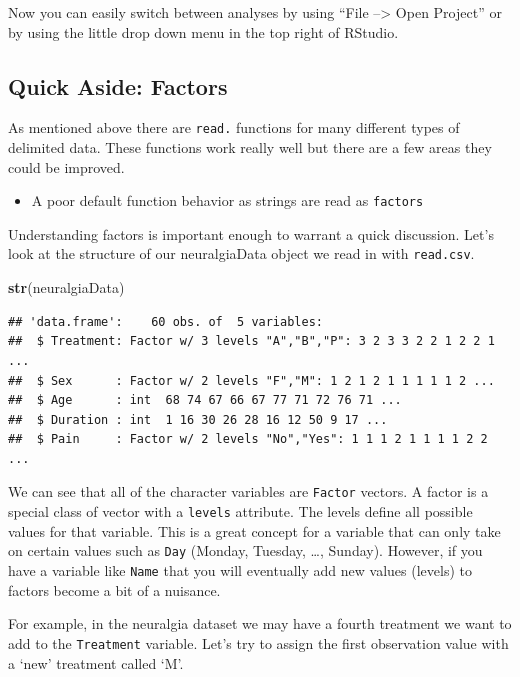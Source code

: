 \documentclass[
]{book}
\newenvironment{Shaded}{\begin{snugshade}}{\end{snugshade}}
\newcommand{\KeywordTok}[1]{\textcolor[rgb]{0.13,0.29,0.53}{\textbf{#1}}}
\newcommand{\NormalTok}[1]{#1}
\providecommand{\tightlist}{%
  \setlength{\itemsep}{0pt}\setlength{\parskip}{0pt}}
\theoremstyle{definition}
\theoremstyle{definition}
\theoremstyle{definition}
\theoremstyle{remark}
\begin{document}
Now you can easily switch between analyses by using ``File --\textgreater{} Open Project'' or by using the little drop down menu in the top right of RStudio.

\hypertarget{quick-aside-factors-1}{%
\subsection{Quick Aside: Factors}\label{quick-aside-factors-1}}

As mentioned above there are \texttt{read.} functions for many different types of delimited data. These functions work really well but there are a few areas they could be improved.

\begin{itemize}
\tightlist
\item
  A poor default function behavior as strings are read as \texttt{factors}
\end{itemize}

Understanding factors is important enough to warrant a quick discussion. Let's look at the structure of our neuralgiaData object we read in with \texttt{read.csv}.

\begin{Shaded}
\begin{Highlighting}[]
\KeywordTok{str}\NormalTok{(neuralgiaData)}
\end{Highlighting}
\end{Shaded}

\begin{verbatim}
## 'data.frame':    60 obs. of  5 variables:
##  $ Treatment: Factor w/ 3 levels "A","B","P": 3 2 3 3 2 2 1 2 2 1 ...
##  $ Sex      : Factor w/ 2 levels "F","M": 1 2 1 2 1 1 1 1 1 2 ...
##  $ Age      : int  68 74 67 66 67 77 71 72 76 71 ...
##  $ Duration : int  1 16 30 26 28 16 12 50 9 17 ...
##  $ Pain     : Factor w/ 2 levels "No","Yes": 1 1 1 2 1 1 1 1 2 2 ...
\end{verbatim}

We can see that all of the character variables are \texttt{Factor} vectors. A factor is a special class of vector with a \texttt{levels} attribute. The levels define all possible values for that variable. This is a great concept for a variable that can only take on certain values such as \texttt{Day} (Monday, Tuesday, \ldots{}, Sunday). However, if you have a variable like \texttt{Name} that you will eventually add new values (levels) to factors become a bit of a nuisance.

For example, in the neuralgia dataset we may have a fourth treatment we want to add to the \texttt{Treatment} variable. Let's try to assign the first observation value with a `new' treatment called `M'.
\end{document}
